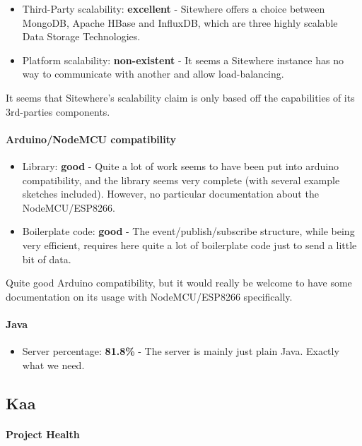 \documentclass{article}
\begin{document}
\begin{itemize}
\item Third-Party scalability: \textbf{excellent} - Sitewhere offers a choice between MongoDB, Apache HBase and InfluxDB, which are three highly scalable Data Storage Technologies.
\item Platform scalability: \textbf{non-existent} - It seems a Sitewhere instance has no way to communicate with another and allow load-balancing.
\end{itemize}

It seems that Sitewhere's scalability claim is only based off the capabilities of its 3rd-parties components.

\paragraph{Arduino/NodeMCU compatibility}

\begin{itemize}
\item Library: \textbf{good} - Quite a lot of work seems to have been put into arduino compatibility, and the library seems very complete (with several example sketches included). However, no particular documentation about the NodeMCU/ESP8266.
\item Boilerplate code: \textbf{good} - The event/publish/subscribe structure, while being very efficient, requires here quite a lot of boilerplate code just to send a little bit of data.
\end{itemize}

Quite good Arduino compatibility, but it would really be welcome to have some documentation on its usage with NodeMCU/ESP8266 specifically.

\paragraph{Java} 

\begin{itemize}
\item Server percentage: \textbf{81.8\%} - The server is mainly just plain Java. Exactly what we need.
\end{itemize}

\subsection{Kaa}

\paragraph{Project Health}
\end{document}
